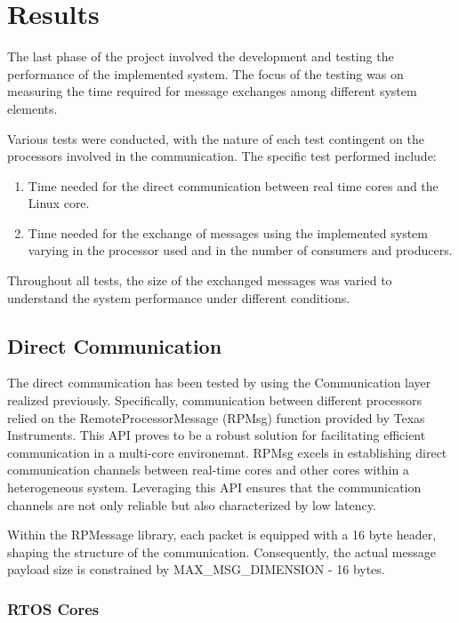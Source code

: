 \section{Results}

The last phase of the project involved the development and testing
the performance of the implemented system.
The focus of the testing was on measuring the time required for message
exchanges among different system elements.

Various tests were conducted, with the nature of each test contingent on the
processors involved in the communication.
The specific test performed include:

\begin{enumerate}
    \item   Time needed for the direct communication between real time cores
            and the Linux core.
    \item   Time needed for the exchange of messages using the implemented
            system varying in the processor used and in the number of
            consumers and producers.
\end{enumerate}

Throughout all tests, the size of the exchanged messages was varied to
understand the system performance under different conditions.

\subsection{Direct Communication}

The direct communication has been tested by using the Communication layer
realized previously.
Specifically, communication between different processors relied on the
RemoteProcessorMessage (RPMsg) function provided by Texas Instruments.
This API proves to be a robust solution for facilitating efficient
communication in a multi-core environemnt. RPMsg excels in establishing direct
communication channels between real-time cores and other cores within a
heterogeneous system. Leveraging this API ensures that the communication
channels are not only reliable but also characterized by low latency.

Within the RPMessage library, each packet is equipped with a 16 byte header,
shaping the structure of the communication. Consequently, the actual message
payload size is constrained by MAX\_MSG\_DIMENSION - 16 bytes.

\subsubsection{RTOS Cores}

